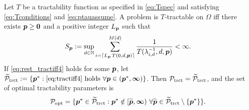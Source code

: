 \documentclass[11pt,a4paper]{article}
\begin{document}
\begin{theorem}\label{thm_main_rest_tract}
Let $T$ be a tractability function as specified in \eqref{eq:Tspec} and satisfying \eqref{eq:Tconditions} and \eqref{eq:ptauassume}.  A problem is $T$-tractable on $\Omega$ iff there exists $\boldsymbol{p}\ge \boldsymbol{0}$ and a positive integer $L_{\boldsymbol{p}}$ such that
\begin{equation} \label{eq:rest_tractiff4}
     S_{\boldsymbol{p}}:=\sup_{d \in \mathbb{N}}
     \sum_{i = \lceil L_{\boldsymbol{p}}\, T(0,d,\boldsymbol{p}) \rceil}^{M(d)} \frac{1}{T(\lambda^{-1}_{i,d},d,\boldsymbol{p})}< \infty.
\end{equation}
If \eqref{eq:rest_tractiff4} holds for some $\boldsymbol{p}$, let $\widetilde{\mathcal{P}}_{\textup{trct}} : = \{\boldsymbol{p}^* : \eqref{eq:tractiff4} \text{ holds }\forall \boldsymbol{p} \in (\boldsymbol{p}^*,\boldsymbol{\infty}) \}$.
Then $\mathcal{P}_{\textup{trct}} = \widetilde{\mathcal{P}}_{\textup{trct}}$, and the set of optimal  tractability parameters is
\[
\mathcal{P}_{\textup{opt}} =
\{\boldsymbol{p}^* \in \widetilde{\mathcal{P}}_{\textup{trct}} :  \boldsymbol{p}^* \notin [\widetilde{\boldsymbol{p}},\boldsymbol{\infty}) \ \forall \widetilde{\boldsymbol{p}}\in  \widetilde{\mathcal{P}}_{\textup{trct}} \setminus \{\boldsymbol{p}^*\} \}.
\]
\end{theorem}
\end{document}
